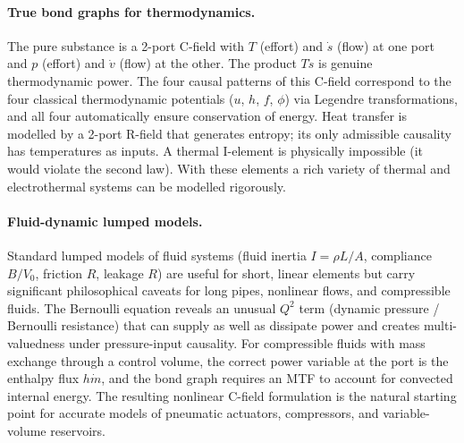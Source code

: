 \paragraph{True bond graphs for thermodynamics.}
The pure substance is a 2-port C-field with $T$ (effort) and $\dot{s}$
(flow) at one port and $p$ (effort) and $\dot{v}$ (flow) at the other.  The
product $T\dot{s}$ is genuine thermodynamic power.  The four causal
patterns of this C-field correspond to the four classical thermodynamic
potentials ($u$, $h$, $f$, $\phi$) via Legendre transformations, and all
four automatically ensure conservation of energy.  Heat transfer is modelled
by a 2-port R-field that generates entropy; its only admissible causality
has temperatures as inputs.  A thermal I-element is physically impossible
(it would violate the second law).  With these elements a rich variety of
thermal and electrothermal systems can be modelled rigorously.

\paragraph{Fluid-dynamic lumped models.}
Standard lumped models of fluid systems (fluid inertia $I = \rho L/A$,
compliance $B/V_{0}$, friction $R$, leakage $R$) are useful for short,
linear elements but carry significant philosophical caveats for long pipes,
nonlinear flows, and compressible fluids.  The Bernoulli equation reveals
an unusual $Q^{2}$ term (dynamic pressure / Bernoulli resistance) that
can supply as well as dissipate power and creates multi-valuedness under
pressure-input causality.  For compressible fluids with mass exchange
through a control volume, the correct power variable at the port is the
enthalpy flux $h\dot{m}$, and the bond graph requires an MTF to account for
convected internal energy.  The resulting nonlinear C-field formulation is
the natural starting point for accurate models of pneumatic actuators,
compressors, and variable-volume reservoirs.